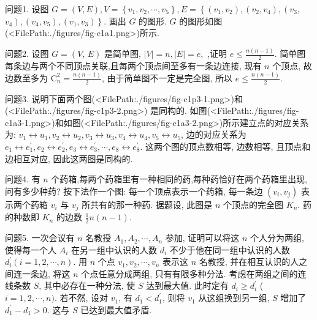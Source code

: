 
问题1. 设图 $G=(V, E), V=\left\{v_1, v_2, \cdots, v_5\right\}, E=\left\{\left(v_1, v_2\right),\left(v_2, v_4\right),\left(v_3\right.\right.$, $\left.\left.v_4\right),\left(v_4, v_5\right),\left(v_1, v_3\right)\right\}$. 画出 $G$ 的图形.
$G$ 的图形如图(<FilePath:./figures/fig-c1a1.png>)所示.



问题2. 设图 $G=(V,\,E)$ 是简单图, $\vert V\vert=n,\vert E\vert=e,$ ,证明 $e\leq{\frac{n(n-1)}{2}}.$ 
简单图每条边与两个不同顶点关联,且每两个顶点间至多有一条边连接, 现有 $n$ 个顶点, 故边数至多为 $\mathrm{C}_n^2=\frac{n(n-1)}{2}$, 由于简单图不一定是完全图, 所以 $e \leqslant \frac{n(n-1)}{2}$.



问题3. 说明下面两个图(<FilePath:./figures/fig-c1p3-1.png>)和(<FilePath:./figures/fig-c1p3-2.png>) 是同构的.
如图(<FilePath:./figures/fig-c1a3-1.png>)和如图(<FilePath:./figures/fig-c1a3-2.png>)所示建立点的对应关系为: $v_1 \longleftrightarrow u_1, v_2 \longleftrightarrow u_2, v_3 \longleftrightarrow u_3, v_4 \longleftrightarrow u_4, v_5 \leftrightarrow u_5$, 边的对应关系为 $e_1 \longleftrightarrow e_1^{\prime}, e_2 \longleftrightarrow e_2^{\prime}, e_3 \leftrightarrow e_3^{\prime}, \cdots, e_8 \leftrightarrow e_8^{\prime}$. 这两个图的顶点数相等, 边数相等, 且顶点和边相互对应, 因此这两图是同构的.



问题4. 有 $n$ 个药箱,每两个药箱里有一种相同的药,每种药恰好在两个药箱里出现, 问有多少种药?
按下法作一个图: 每一个顶点表示一个药箱, 每一条边 $\left(v_i, v_j\right)$ 表示两个药箱 $v_i$ 与 $v_j$ 所共有的那一种药.
据题设, 此图是 $n$ 个顶点的完全图 $K_n$. 药的种数即 $K_n$ 的边数 $\frac{1}{2} n(n-1)$.



问题5. 一次会议有 $n$ 名教授 $A_1, A_2, \cdots, A_n$ 参加, 证明可以将这 $n$ 个人分为两组, 使得每一个人 $A_i$ 在另一组中认识的人数 $d_i$ 不少于他在同一组中认识的人数 $d_i^{\prime}(i=1,2, \cdots, n)$.
用 $n$ 个点 $v_1, v_2, \cdots, v_n$ 表示这 $n$ 名教授, 并在相互认识的人之间连一条边, 将这 $n$ 个点任意分成两组, 只有有限多种分法.
考虑在两组之间的连线条数 $S$, 其中必存在一种分法, 使 $S$ 达到最大值.
此时定有 $d_i \geqslant d_i^{\prime}$ ( $i= 1,2, \cdots, n)$. 若不然, 设对 $v_1$, 有 $d_1<d_1^{\prime}$, 则将 $v_1$ 从这组换到另一组, $S$ 增加了$d_1^{\prime}-d_1>0$. 这与 $S$ 已达到最大值矛盾.



